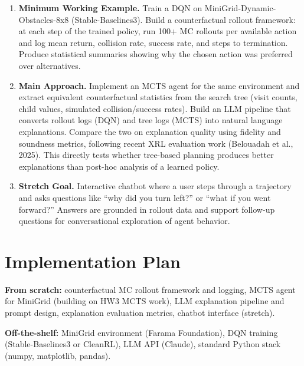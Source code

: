 \documentclass[11pt]{article}
\begin{document}
\begin{enumerate}[leftmargin=*, label=\textbf{\arabic*.}, itemsep=2pt]

\item \textbf{Minimum Working Example.}
Train a DQN on MiniGrid-Dynamic-Obstacles-8x8 (Stable-Baselines3).
Build a counterfactual rollout framework: at each step of the trained policy, run 100+ MC rollouts per available action and log mean return, collision rate, success rate, and steps to termination.
Produce statistical summaries showing why the chosen action was preferred over alternatives.

\item \textbf{Main Approach.}
Implement an MCTS agent for the same environment and extract equivalent counterfactual statistics from the search tree (visit counts, child values, simulated collision/success rates).
Build an LLM pipeline that converts rollout logs (DQN) and tree logs (MCTS) into natural language explanations.
Compare the two on explanation quality using fidelity and soundness metrics, following recent XRL evaluation work (Belouadah et al., 2025).
This directly tests whether tree-based planning produces better explanations than post-hoc analysis of a learned policy.

\item \textbf{Stretch Goal.}
Interactive chatbot where a user steps through a trajectory and asks questions like ``why did you turn left?'' or ``what if you went forward?''
Answers are grounded in rollout data and support follow-up questions for conversational exploration of agent behavior.

\end{enumerate}

\section*{Implementation Plan}

\textbf{From scratch:} counterfactual MC rollout framework and logging, MCTS agent for MiniGrid (building on HW3 MCTS work), LLM explanation pipeline and prompt design, explanation evaluation metrics, chatbot interface (stretch).

\textbf{Off-the-shelf:} MiniGrid environment (Farama Foundation), DQN training (Stable-Baselines3 or CleanRL), LLM API (Claude), standard Python stack (numpy, matplotlib, pandas).
\end{document}
